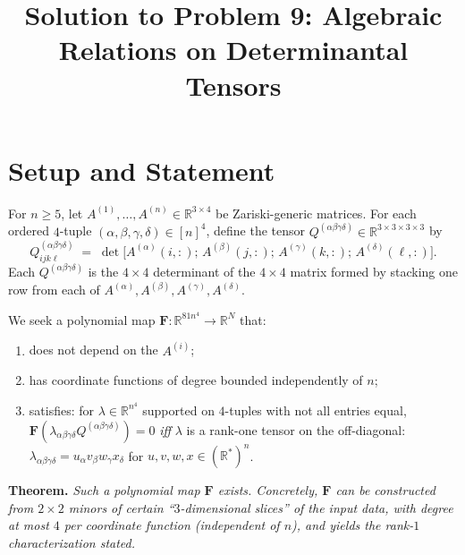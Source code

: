 

\title{Solution to Problem 9: Algebraic Relations on Determinantal Tensors}
\date{}

\maketitle

\section*{Setup and Statement}

For $n\geq 5$, let $A^{(1)},\ldots,A^{(n)}\in\mathbb R^{3\times 4}$ be Zariski-generic matrices.  For each ordered $4$-tuple $(\alpha,\beta,\gamma,\delta)\in[n]^4$, define the tensor $Q^{(\alpha\beta\gamma\delta)}\in\mathbb R^{3\times 3\times 3\times 3}$ by
\[
Q^{(\alpha\beta\gamma\delta)}_{ijk\ell} \;=\; \det\bigl[A^{(\alpha)}(i,:);\,A^{(\beta)}(j,:);\,A^{(\gamma)}(k,:);\,A^{(\delta)}(\ell,:)\bigr].
\]
Each $Q^{(\alpha\beta\gamma\delta)}$ is the $4 \times 4$ determinant of the $4\times 4$ matrix formed by stacking one row from each of $A^{(\alpha)},A^{(\beta)},A^{(\gamma)},A^{(\delta)}$.

\medskip
We seek a polynomial map $\mathbf F:\mathbb R^{81n^4}\to\mathbb R^N$ that:
\begin{enumerate}\setlength\itemsep{2pt}
\item does not depend on the $A^{(i)}$;
\item has coordinate functions of degree bounded independently of $n$;
\item satisfies: for $\lambda\in\mathbb R^{n^4}$ supported on $4$-tuples with not all entries equal, $\mathbf F(\lambda_{\alpha\beta\gamma\delta} Q^{(\alpha\beta\gamma\delta)})=0$ \emph{iff} $\lambda$ is a rank-one tensor on the off-diagonal: $\lambda_{\alpha\beta\gamma\delta}=u_\alpha v_\beta w_\gamma x_\delta$ for $u,v,w,x\in(\mathbb R^*)^n$.
\end{enumerate}

\medskip
\noindent\textbf{Theorem.}  \emph{Such a polynomial map $\mathbf F$ exists.  Concretely, $\mathbf F$ can be constructed from $2\times 2$ minors of certain ``$3$-dimensional slices'' of the input data, with degree at most $4$ per coordinate function (independent of $n$), and yields the rank-$1$ characterization stated.}

